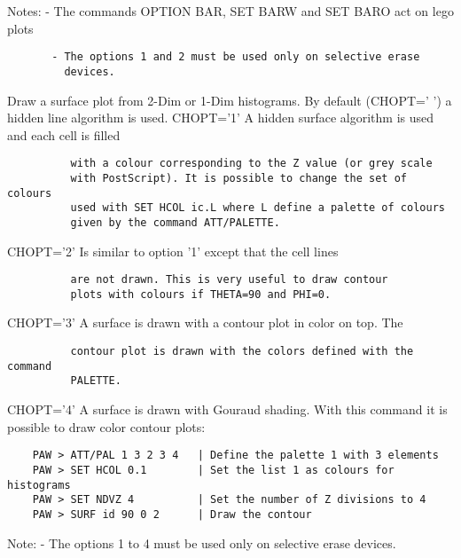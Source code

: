 Notes: - The commands OPTION BAR, SET BARW and SET BARO act on lego plots
\begin{verbatim}
       - The options 1 and 2 must be used only on selective erase
         devices.
\end{verbatim}
\ENDTEXT

\BEGARG
{}
\ENDARG
\BEGTEXT
Draw a surface plot from 2-Dim or 1-Dim histograms.
By default (CHOPT=' ') a hidden line algorithm is used.
CHOPT='1' A hidden surface algorithm is used and each cell is filled
\begin{verbatim}
          with a colour corresponding to the Z value (or grey scale
          with PostScript). It is possible to change the set of colours
          used with SET HCOL ic.L where L define a palette of colours
          given by the command ATT/PALETTE.
\end{verbatim}
CHOPT='2' Is similar to option '1' except that the cell lines
\begin{verbatim}
          are not drawn. This is very useful to draw contour
          plots with colours if THETA=90 and PHI=0.
\end{verbatim}
CHOPT='3' A surface is drawn with a contour plot in color on top. The
\begin{verbatim}
          contour plot is drawn with the colors defined with the command
          PALETTE.
\end{verbatim}
CHOPT='4' A surface is drawn with Gouraud shading.
With this command it is possible to draw color contour plots:
\begin{verbatim}
    PAW > ATT/PAL 1 3 2 3 4   | Define the palette 1 with 3 elements
    PAW > SET HCOL 0.1        | Set the list 1 as colours for histograms
    PAW > SET NDVZ 4          | Set the number of Z divisions to 4
    PAW > SURF id 90 0 2      | Draw the contour
\end{verbatim}

Note: - The options 1 to 4 must be used only on selective erase devices.
\ENDTEXT

